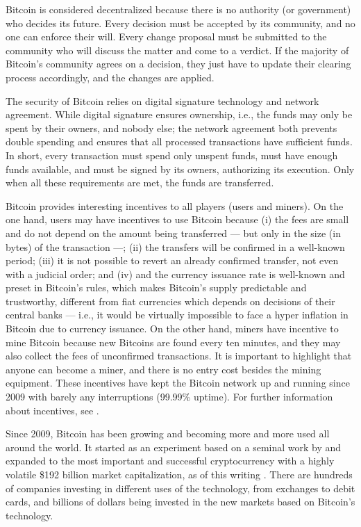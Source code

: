 Bitcoin is considered decentralized because there is no authority (or government) who decides its future. Every decision must be accepted by its community, and no one can enforce their will. Every change proposal must be submitted to the community who will discuss the matter and come to a verdict. If the majority of Bitcoin's community agrees on a decision, they just have to update their clearing process accordingly, and the changes are applied.

The security of Bitcoin relies on digital signature technology and network agreement. While digital signature ensures ownership, i.e., the funds may only be spent by their owners, and nobody else; the network agreement both prevents double spending and ensures that all processed transactions have sufficient funds. In short, every transaction must spend only unspent funds, must have enough funds available, and must be signed by its owners, authorizing its execution. Only when all these requirements are met, the funds are transferred.

Bitcoin provides interesting incentives to all players (users and miners). On the one hand, users may have incentives to use Bitcoin because (i) the fees are small and do not depend on the amount being transferred --- but only in the size (in bytes) of the transaction ---; (ii) the transfers will be confirmed in a well-known period; (iii) it is not possible to revert an already confirmed transfer, not even with a judicial order; and (iv) and the currency issuance rate is well-known and preset in Bitcoin's rules, which makes Bitcoin's supply predictable and trustworthy, different from fiat currencies which depends on decisions of their central banks --- i.e., it would be virtually impossible to face a hyper inflation in Bitcoin due to currency issuance. On the other hand, miners have incentive to mine Bitcoin because new Bitcoins are found every ten minutes, and they may also collect the fees of unconfirmed transactions. It is important to highlight that anyone can become a miner, and there is no entry cost besides the mining equipment. These incentives have kept the Bitcoin network up and running since 2009 with barely any interruptions (99.99\% uptime). For further information about incentives, see \citet{ma2018market, catalini2016some}.

Since 2009, Bitcoin has been growing and becoming more and more used all around the world. It started as an experiment based on a seminal work by \citet{nakamoto2008bitcoin} and expanded to the most important and successful cryptocurrency with a highly volatile \$192 billion market capitalization, as of this writing \citep{coinmarketcapbtc}. There are hundreds of companies investing in different uses of the technology, from exchanges to debit cards, and billions of dollars being invested in the new markets based on Bitcoin's technology.

